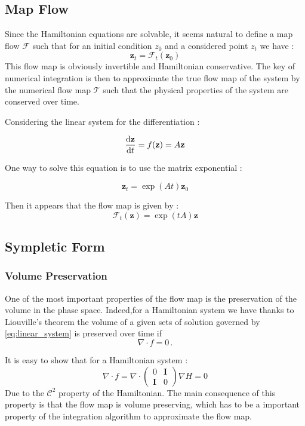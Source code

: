\documentclass[ansiapaper]{report}
\begin{document}
\begin{multicols}{3}
  \subsection{Map Flow}

  Since the Hamiltonian equations are solvable, it seems natural to define a map flow $\mathcal{F}$ such that for an initial condition $z_0$ and a considered point $z_t$ we have :
  $$\textbf{z} _t = \mathcal{F}_t(\textbf{z}_0)$$
  This flow map is obviously invertible and Hamiltonian conservative. The key of numerical integration is then to approximate the true flow map of the system by the numerical flow map $\mathcal{T}$ such that the physical properties of the system are conserved over time.

  Considering the linear system for the differentiation :

  \begin{equation}
    \label{eq:linear_system}
    \dv{\textbf{z}}{t} = f(\textbf{z} ) = A\textbf{z}
  \end{equation}

  One way to solve this equation is to use the matrix exponential :

  $$\textbf{z}_t = \exp(At)\textbf{z}_0$$

  Then it appears that the flow map is given by :
  \begin{equation}
    \label{eq:flow_map}
    \mathcal{F}_t(\textbf{z} ) = \exp(tA)\textbf{z}
  \end{equation}

  \subsection{Sympletic Form}

  \subsubsection{Volume Preservation}
  One of the most important properties of the flow map is the preservation of the volume in the phase space. Indeed,for a Hamiltonian system we have thanks to Liouville's theorem the volume of a given sets of solution governed by \cref{eq:linear_system} is preserved over time if $$ \nabla \cdot f = 0 \, .$$

  It is easy to show that for a Hamiltonian system : $$\nabla \cdot f = \nabla \cdot \begin{pmatrix}
      0          & \textbf{I} \\
      \textbf{I} & 0
    \end{pmatrix} \nabla H = 0$$
  Due to the $\mathcal{C}^2$ property of the Hamiltonian. The main consequence of this property is that the flow map is volume preserving, which has to be a important property of the integration algorithm to approximate the flow map.


\end{multicols}
\end{document}
